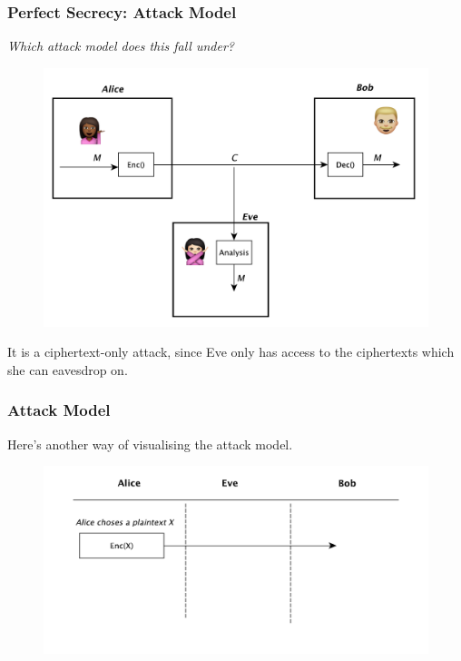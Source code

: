 \documentclass{beamer}
\newcommand{\<}{\langle}
\renewcommand{\>}{\rangle}
\begin{document}
\begin{frame}
\frametitle{Perfect Secrecy: Attack Model}

\emph{Which attack model does this fall under?} \newline

\pause

\begin{figure}
\includegraphics[scale=.3]{IMG/attack1}
\end{figure}
It is a ciphertext-only attack, since Eve only has access to the ciphertexts which she can eavesdrop on.
\end{frame}


\begin{frame}
\frametitle{Attack Model}

Here's another way of visualising the attack model.
\begin{figure}
\includegraphics[scale=.5]{IMG/perfectsecrecy}
\end{figure}
\end{frame}
\end{document}
